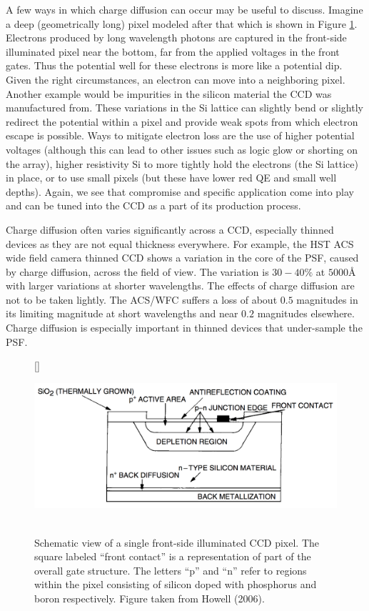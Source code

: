 \documentclass[a4paper,10pt]{article}
\begin{document}
{\noindent}A few ways in which charge diffusion can occur may be useful to discuss. Imagine a deep (geometrically long) pixel modeled after that which is shown in Figure \ref{fig:ccdschematic}. Electrons produced by long wavelength photons are captured in the front-side illuminated pixel near the bottom, far from the applied voltages in the front gates. Thus the potential well for these electrons is more like a potential dip. Given the right circumstances, an electron can move into a neighboring pixel. Another example would be impurities in the silicon material the CCD was manufactured from. These variations in the Si lattice can slightly bend or slightly redirect the potential within a pixel and provide weak spots from which electron escape is possible. Ways to mitigate electron loss are the use of higher potential voltages (although this can lead to other issues such as logic glow or shorting on the array), higher resistivity Si to more tightly hold the electrons (the Si lattice) in place, or to use small pixels (but these have lower red QE and small well depths). Again, we see that compromise and specific application come into play and can be tuned into the CCD as a part of its production process.

{\noindent}Charge diffusion often varies significantly across a CCD, especially thinned devices as they are not equal thickness everywhere. For example, the HST ACS wide field camera thinned CCD shows a variation in the core of the PSF, caused by charge diffusion, across the field of view. The variation is $30-40\%$ at $5000$\AA\,with larger variations at shorter wavelengths. The effects of charge diffusion are not to be taken lightly. The ACS/WFC suffers a loss of about $0.5$ magnitudes in its limiting magnitude at short wavelengths and near $0.2$ magnitudes elsewhere. Charge diffusion is especially important in thinned devices that under-sample the PSF.

\begin{figure}[h]
    [\FBwidth]
    {\caption{\footnotesize{\\Schematic view of a single front-side illuminated CCD pixel. The square labeled ``front contact'' is a representation of part of the overall gate structure. The letters ``p'' and ``n'' refer to regions within the pixel consisting of silicon doped with phosphorus and boron respectively. Figure taken from Howell (2006).}}
    \label{fig:ccdschematic}}
    {\includegraphics[width=12cm]{figures/CCDschematic.png}}
\end{figure}
\end{document}
